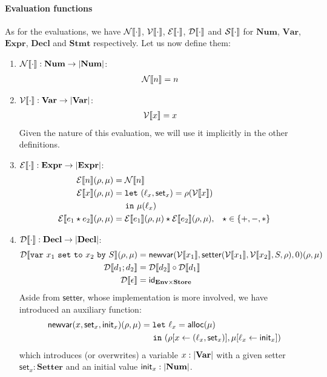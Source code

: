 \documentclass{../../psv}
\newcommand{\Num}{\mathbf{Num}}
\newcommand{\Var}{\mathbf{Var}}
\newcommand{\Expr}{\mathbf{Expr}}
\newcommand{\Decl}{\mathbf{Decl}}
\newcommand{\Stmt}{\mathbf{Stmt}}
\newcommand{\Store}{\mathbf{Store}}
\newcommand{\Setter}{\mathbf{Setter}}
\newcommand{\Env}{\mathbf{Env}}
\newcommand{\Numeval}[1]{\mathcal{N}\eval{#1}}
\newcommand{\Vareval}[1]{\mathcal{V}\eval{#1}}
\newcommand{\Expreval}[1]{\mathcal{E}\eval{#1}}
\newcommand{\Decleval}[1]{\mathcal{D}\eval{#1}}
\newcommand{\Stmteval}[1]{\mathcal{S}\eval{#1}}
\newcommand{\offset}{\hspace{1.4em}}
\begin{document}
  \paragraph{Evaluation functions}  As for the evaluations, we have $\Numeval{\cdot}$, $\Vareval{\cdot}$, $\Expreval{\cdot}$, $\Decleval{\cdot}$ and $\Stmteval{\cdot}$ for $\Num$, $\Var$, $\Expr$, $\Decl$ and $\Stmt$ respectively. Let us now define them:
  \begin{enumerate}
    \item $\Numeval{\cdot}: \Num \to \domain{\Num}$:
    \begin{align*}
      \Numeval{n} &= n
    \end{align*}

    \item $\Vareval{\cdot}: \Var \to \domain{\Var}$:
    \begin{align*}
      \Vareval{x} &= x
    \end{align*}
    Given the nature of this evaluation, we will use it implicitly in the other definitions.

    \item $\Expreval{\cdot}: \Expr \to \domain{\Expr}$:
    \begin{align*}
      \Expreval{n} (\rho, \mu) &= \Numeval{n}\\
      \Expreval{x} (\rho, \mu) &= \mathtt{let\ } (\ell_x, \mathsf{set}_x) = \rho(\Vareval{x})\\
      &\offset \mathtt{in\ } \mu(\ell_x)\\
      \Expreval{e_1 \star e_2} (\rho, \mu) &= \Expreval{e_1} (\rho, \mu) \star \Expreval{e_2} (\rho, \mu), &\star \in \set{+, -, \ast}
    \end{align*}

    \item $\Decleval{\cdot}: \Decl \to \domain{\Decl}$:
    \begin{align*}
      \Decleval{\mathtt{var\ } x_1 \mathtt{\ set\ to\ } x_2 \mathtt{\ by\ } S} (\rho, \mu) &= \mathsf{newvar}(\Vareval{x_1}, \mathsf{setter}(\Vareval{x_1}, \Vareval{x_2}, S, \rho), 0) (\rho, \mu)\\
      \Decleval{d_1; d_2} &= \Decleval{d_2} \circ \Decleval{d_1}\\
      \Decleval{\epsilon} &= \mathsf{id}_{\Env \times \Store}
    \end{align*}
    Aside from $\mathsf{setter}$, whose implementation is more involved, we have introduced an auxiliary function:
    \begin{align*}
      \mathsf{newvar}(x, \mathsf{set}_x, \mathsf{init}_x)(\rho, \mu) &= \mathtt{let\ } \ell_x = \mathsf{alloc}(\mu)\\
      &\offset \mathtt{in\ } (\rho[x \gets (\ell_x, \mathsf{set}_x)], \mu[\ell_x \gets \mathsf{init}_x])
    \end{align*}
    which introduces (or overwrites) a variable $x: \domain{\Var}$ with a given setter $\mathsf{set}_x: \Setter$ and an initial value $\mathsf{init}_x: \domain{\Num}$.


\end{enumerate}
\end{document}
